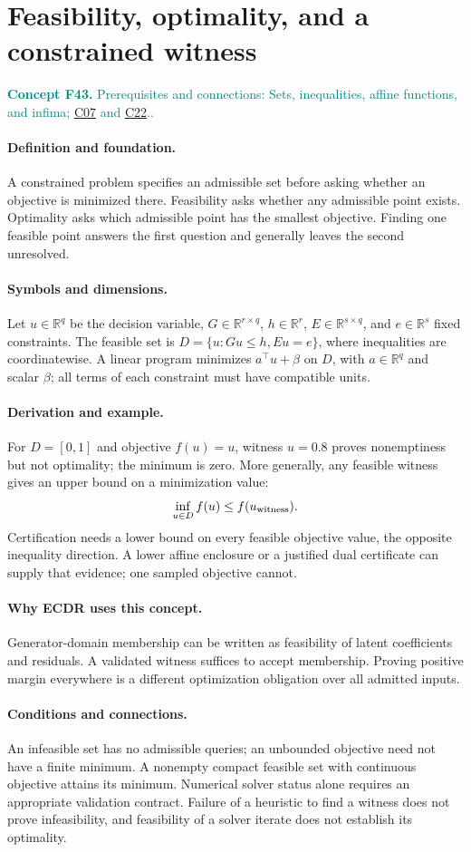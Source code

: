 \documentclass[11pt,a4paper]{article}
\newcommand{\R}{\mathbb R}
\newcommand{\conceptid}{Front matter}
\newcommand{\concept}[3]{\clearpage\renewcommand{\conceptid}{#1}%
\section{#2}\label{concept:#1}%
\textcolor{teal}{\textbf{Concept #1.} Prerequisites and connections: #3.}\par
\typeout{ECDR-CONCEPT-START #1 PAGE=\thepage}}
\begin{document}
\concept{F43}{Feasibility, optimality, and a constrained witness}{Sets, inequalities, affine functions, and infima; \hyperref[concept:C07]{C07} and \hyperref[concept:C22]{C22}.}
\paragraph{Definition and foundation.}
A constrained problem specifies an admissible set before asking whether an objective is minimized there. Feasibility asks whether any admissible point exists. Optimality asks which admissible point has the smallest objective. Finding one feasible point answers the first question and generally leaves the second unresolved.
\paragraph{Symbols and dimensions.}
Let $u\in\R^q$ be the decision variable, $G\in\R^{r\times q}$, $h\in\R^r$, $E\in\R^{s\times q}$, and $e\in\R^s$ fixed constraints. The feasible set is $D=\{u:Gu\le h,Eu=e\}$, where inequalities are coordinatewise. A linear program minimizes $a^\top u+\beta$ on $D$, with $a\in\R^q$ and scalar $\beta$; all terms of each constraint must have compatible units.
\paragraph{Derivation and example.}
For $D=[0,1]$ and objective $f(u)=u$, witness $u=0.8$ proves nonemptiness but not optimality; the minimum is zero. More generally, any feasible witness gives an upper bound on a minimization value:
\[
 \inf_{u\in D}f(u)\le f(u_{\rm witness}).
\]
Certification needs a lower bound on every feasible objective value, the opposite inequality direction. A lower affine enclosure or a justified dual certificate can supply that evidence; one sampled objective cannot.
\paragraph{Why ECDR uses this concept.}
Generator-domain membership can be written as feasibility of latent coefficients and residuals. A validated witness suffices to accept membership. Proving positive margin everywhere is a different optimization obligation over all admitted inputs.
\paragraph{Conditions and connections.}
An infeasible set has no admissible queries; an unbounded objective need not have a finite minimum. A nonempty compact feasible set with continuous objective attains its minimum. Numerical solver status alone requires an appropriate validation contract. Failure of a heuristic to find a witness does not prove infeasibility, and feasibility of a solver iterate does not establish its optimality.
\par\label{endconcept:F43}
\end{document}
